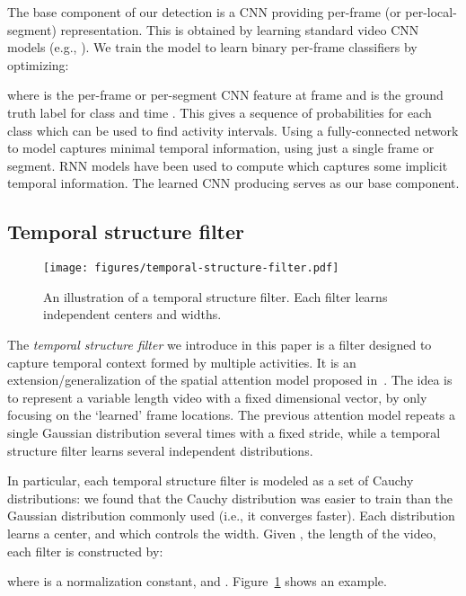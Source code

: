 \documentclass[10pt,twocolumn,letterpaper]{article}
\begin{document}
The base component of our detection is a CNN providing per-frame (or per-local-segment) representation. This is obtained by learning standard video CNN models (e.g., \cite{simonyan2014two,carreira2017quo}). We train the model to learn binary per-frame classifiers by optimizing:

where  is the per-frame or per-segment CNN feature at frame  and  is the ground truth label for class  and time . This gives a sequence of probabilities for each class which can be used to find activity intervals. Using a fully-connected network to model  captures minimal temporal information, using just a single frame or segment. RNN models have been used to compute  which captures some implicit temporal information. 
The learned CNN producing  serves as our base component.





\subsection{Temporal structure filter}
\begin{figure}
  \centering
    \texttt{[image: figures/temporal-structure-filter.pdf]}
      \caption{An illustration of a temporal structure filter. Each filter learns independent centers and widths.}
      \label{fig:temporal-filter}
\end{figure}

The \emph{temporal structure filter} we introduce in this paper is a filter designed to capture temporal context formed by multiple activities. It is an extension/generalization of the spatial attention model proposed in~\cite{gregor2015draw}. The idea is to represent a variable length video with a fixed dimensional vector, by only focusing on the `learned' frame locations. 
The previous attention model repeats a single Gaussian distribution several times with a fixed stride, while a temporal structure filter learns several independent distributions.

In particular, each temporal structure filter is modeled as a set of  Cauchy distributions: we found that the Cauchy distribution was easier to train than the Gaussian distribution commonly used (i.e., it converges faster). Each distribution learns a center,  and  which controls the width. Given , the length of the video, each filter is constructed by:

where  is a normalization constant,  and . Figure~\ref{fig:temporal-filter} shows an example.
\end{document}
